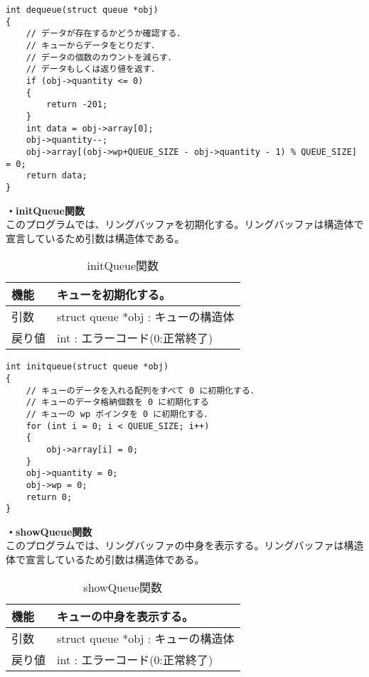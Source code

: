 \documentclass[dvipdfmx]{jsarticle}
\begin{document}
\begin{lstlisting}[caption={dequeue関数}, label={lst:dequeue_func_2}]
int dequeue(struct queue *obj)
{
    // データが存在するかどうか確認する．
    // キューからデータをとりだす．
    // データの個数のカウントを減らす．
    // データもしくは返り値を返す．
    if (obj->quantity <= 0)
    {
        return -201;
    }
    int data = obj->array[0];
    obj->quantity--;
    obj->array[(obj->wp+QUEUE_SIZE - obj->quantity - 1) % QUEUE_SIZE] = 0;
    return data;
}
\end{lstlisting}
\textbf{・initQueue関数}\\
このプログラムでは、リングバッファを初期化する。リングバッファは構造体で宣言しているため引数は構造体である。
\begin{table}[ht]
  \centering
  \caption{initQueue関数}
  \begin{tabular}{|p{5cm}|p{10cm}|}
    \hline
    機能  & キューを初期化する。                                      \\
    \hline
    引数  & struct queue *obj : キューの構造体 \\
    \hline
    戻り値 & int : エラーコード(0:正常終了) \\
    \hline
  \end{tabular}
  \label{tab:initQueue_func_2}
\end{table}
\begin{lstlisting}[caption={initQueue関数}, label={lst:initQueue_func_2}]
int initqueue(struct queue *obj)
{
    // キューのデータを入れる配列をすべて 0 に初期化する．
    // キューのデータ格納個数を 0 に初期化する
    // キューの wp ポインタを 0 に初期化する．
    for (int i = 0; i < QUEUE_SIZE; i++)
    {
        obj->array[i] = 0;
    }
    obj->quantity = 0;
    obj->wp = 0;
    return 0;
}
\end{lstlisting}
\textbf{・showQueue関数}\\
このプログラムでは、リングバッファの中身を表示する。リングバッファは構造体で宣言しているため引数は構造体である。
\begin{table}[ht]
  \centering
  \caption{showQueue関数}
  \begin{tabular}{|p{5cm}|p{10cm}|}
    \hline
    機能  & キューの中身を表示する。                                      \\
    \hline
    引数  & struct queue *obj : キューの構造体 \\
    \hline
    戻り値 & int : エラーコード(0:正常終了) \\
    \hline
  \end{tabular}
  \label{tab:showQueue_func_2}
\end{table}
\end{document}
